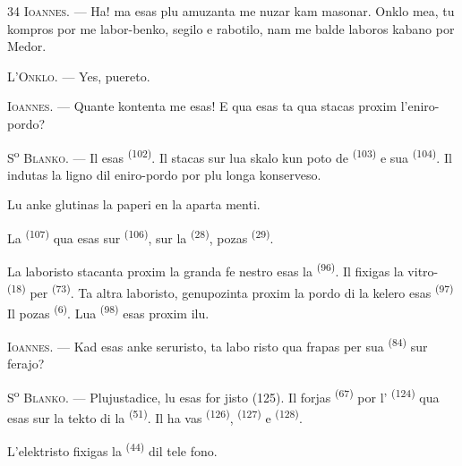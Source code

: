 \begin{VUpage}[36]{34}
\VUblancAlinea
\textsc{Ioannes}. --- Ha! ma esas plu amuzanta me\cc
nuzar kam masonar. Onklo mea, tu kompros\nl
por me labor-benko, segilo e rabotilo, nam me\nl
balde laboros kabano por Medor.

\VUblancAlinea
\textsc{L'Onklo}. --- Yes, puereto.

\VUblancAlinea
\textsc{Ioannes}. --- Quante kontenta me esas! E qua\nl
esas ta qua stacas proxim l'eniro-pordo?

\VUsaut{3.0mm}
\VUsaut{3.0mm}

\VUblancAlinea
S\textsuperscript{o} \textsc{Blanko}. --- Il esas  \textsuperscript{(102)}. Il stacas\nl
sur lua skalo kun poto de  \textsuperscript{(103)} e sua \cc
{} \textsuperscript{(104)}. Il indutas la ligno dil eniro-pordo\nl
por plu longa konserveso.

\VUblancAlinea
Lu anke glutinas la paperi en la aparta\cc
menti.

\VUblancAlinea
La  \textsuperscript{(107)} qua esas sur  \textsuperscript{(106)}, sur\nl
la  \textsuperscript{(28)}, pozas  \textsuperscript{(29)}.

\VUblancAlinea
La laboristo stacanta proxim la granda fe\cc
nestro esas la  \textsuperscript{(96)}. Il fixigas la vitro-\nl
{} \textsuperscript{(18)} per  \textsuperscript{(73)}. Ta altra laboristo,\nl
genupozinta proxim la pordo di la kelero esas\nl
{} \textsuperscript{(97)} Il pozas  \textsuperscript{(6)}. Lua  \textsuperscript{(98)}\nl
esas proxim ilu.

\VUblancAlinea
\textsc{Ioannes}. --- Kad esas anke seruristo, ta labo\cc
risto qua frapas per sua  \textsuperscript{(84)} sur ferajo?

\VUblancAlinea
S\textsuperscript{o} \textsc{Blanko}. --- Plujustadice, lu esas for\cc
jisto (125). Il forjas  \textsuperscript{(67)} por l' \textsuperscript{(124)}\nl
qua esas sur la tekto di la  \textsuperscript{(51)}. Il ha\cc
vas  \textsuperscript{(126)},  \textsuperscript{(127)} e  \textsuperscript{(128)}.

\VUblancAlinea
L'elektristo fixigas la  \textsuperscript{(44)}  dil tele\cc
fono.
\end{VUpage}

